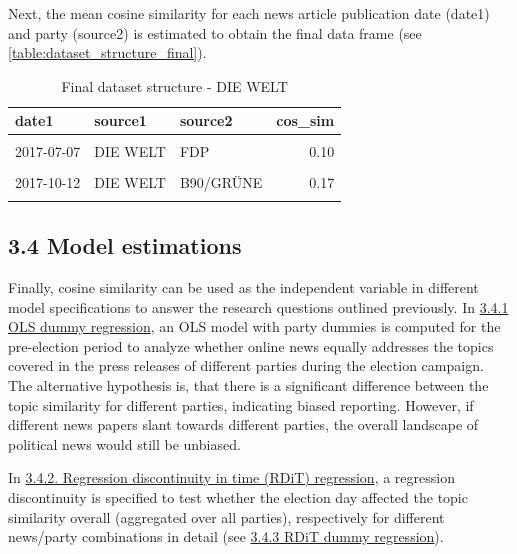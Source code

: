 \documentclass[
  12pt,
]{article}
\begin{document}
Next, the mean cosine similarity for each news article publication date
(date1) and party (source2) is estimated to obtain the final data frame
(see \autoref{table:dataset_structure_final}).

\begin{table}[H]

\caption{\label{tab:Dataset structure final}Final dataset structure - DIE WELT \label{table:dataset_structure_final}}
\centering
\fontsize{7}{9}\selectfont
\begin{tabular}[t]{lllr}
\toprule
date1 & source1 & source2 & cos\_sim\\
\midrule
\cellcolor{gray!6}{2017-12-09} & \cellcolor{gray!6}{DIE WELT} & \cellcolor{gray!6}{DIE LINKE} & \cellcolor{gray!6}{0.16}\\
2017-07-07 & DIE WELT & FDP & 0.10\\
\cellcolor{gray!6}{2017-11-06} & \cellcolor{gray!6}{DIE WELT} & \cellcolor{gray!6}{CDU} & \cellcolor{gray!6}{0.08}\\
2017-10-12 & DIE WELT & B90/GRÜNE & 0.17\\
\cellcolor{gray!6}{2017-11-15} & \cellcolor{gray!6}{DIE WELT} & \cellcolor{gray!6}{SPD} & \cellcolor{gray!6}{0.12}\\
\bottomrule
\end{tabular}
\end{table}

\hypertarget{model-estimations}{%
\subsection{3.4 Model estimations}\label{model-estimations}}

Finally, cosine similarity can be used as the independent variable in
different model specifications to answer the research questions outlined
previously. In \protect\hyperlink{ols-dummy-regression}{3.4.1 OLS dummy
regression}, an OLS model with party dummies is computed for the
pre-election period to analyze whether online news equally addresses the
topics covered in the press releases of different parties during the
election campaign. The alternative hypothesis is, that there is a
significant difference between the topic similarity for different
parties, indicating biased reporting. However, if different news papers
slant towards different parties, the overall landscape of political news
would still be unbiased.

In \protect\hyperlink{rdit}{3.4.2. Regression discontinuity in time
(RDiT) regression}, a regression discontinuity is specified to test
whether the election day affected the topic similarity overall
(aggregated over all parties), respectively for different news/party
combinations in detail (see \protect\hyperlink{rdit-dummy}{3.4.3 RDiT
dummy regression}).
\end{document}
